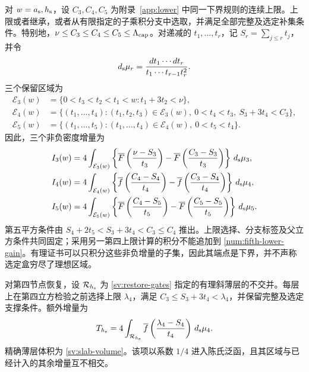 对 $w={a_{\rm s}},{h_{\rm s}}$，设 $C_3,C_4,C_5$ 为附录~\ref{app:lower} 中同一下界规则的连续上限。上限或者继承，或者从有限指定的子乘积分支中选取，并满足全部完整及选定补集条件。特别地，$\nu\le C_3\le C_4\le C_5\le\Lambda_{\rm cap}$。对递减的 $t_1,\ldots,t_r$，记 $S_r=\sum_{j\le r}t_j$，并令
\[
 {d_{\rm s}}\mu_r=\frac{dt_1\cdots dt_r}{t_1\cdots t_{r-1}t_r^2}.
\]
三个保留区域为
\begin{align*}
 \mathcal E_3(w)&=\{0<t_3<t_2<t_1<w:t_1+3t_2<\nu\},\\
 \mathcal E_4(w)&=\{(t_1,\ldots,t_4):(t_1,t_2,t_3)\in\mathcal E_3(w),
          \ 0<t_4<t_3,\ S_3+3t_4<C_3\},\\
 \mathcal E_5(w)&=\{(t_1,\ldots,t_5):(t_1,\ldots,t_4)\in\mathcal E_4(w),
                                      \ 0<t_5<t_4\}.
\end{align*}
因此，三个非负密度增量为
\begin{align}
 I_3(w)&=4\int_{\mathcal E_3(w)}
  \left\{\overline F\left(\frac{\nu-S_3}{t_3}\right)
        -\overline F\left(\frac{C_3-S_3}{t_3}\right)\right\}\,{d_{\rm s}}\mu_3,
                                      \label{num:third-lower-gain}\\
 I_4(w)&=4\int_{\mathcal E_4(w)}
  \left\{\overline f\left(\frac{C_4-S_4}{t_4}\right)
        -\overline f\left(\frac{C_3-S_4}{t_4}\right)\right\}\,{d_{\rm s}}\mu_4,
                                      \label{num:fourth-lower-gain}\\
 I_5(w)&=4\int_{\mathcal E_5(w)}
  \left\{\overline F\left(\frac{C_4-S_5}{t_5}\right)
        -\overline F\left(\frac{C_5-S_5}{t_5}\right)\right\}\,{d_{\rm s}}\mu_5.
                                      \label{num:fifth-lower-gain}
\end{align}
第五平方条件由 $S_4+2t_5<S_3+3t_4<C_3\le C_4$ 推出。上限选择、分支标签及父立方条件共同固定；采用另一第四上限计算的积分不能追加到 \eqref{num:fifth-lower-gain}。有理证书可以只积分这些非负增量的子集，因此其端点是下界，并不声称选定盒穷尽了理想区域。

对第四节点恢复，设 $\mathcal R_{h_{\rm s}}$ 为 \eqref{sv:restore-gates} 指定的有理斜薄层的不交并。每层上在第四立方检验之前选择上限 $\lambda_4$，满足 $C_3\le S_3+3t_4<\lambda_4$，并保留完整及选定支撑条件。额外增量为
\begin{equation}
 T_{h_{\rm s}}=4\int_{\mathcal R_{h_{\rm s}}}
       \overline f\left(\frac{\lambda_4-S_4}{t_4}\right)\,{d_{\rm s}}\mu_4.
 \label{num:restoration-integral}
\end{equation}
精确薄层体积为 \eqref{sv:slab-volume}。该项以系数 $1/4$ 进入陈氏泛函，且其区域与已经计入的其余增量互不相交。

